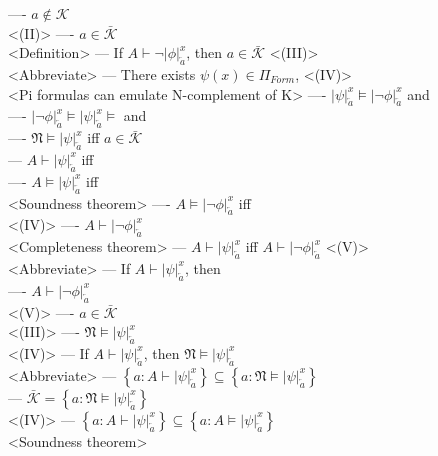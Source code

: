 \documentclass{book}
\newcommand{\inot}{\not}
\newcommand{\set}[1]{\left\{ #1 \right\}}
\newcommand{\sub}[3]{\left|#1\right|_{#3}^{#2}}
\begin{document}
				---- $a \inot \in \mathcal{K}$ \\ <(II)>
				---- $a \in \bar{\mathcal{K}}$ \\ <Definition>
			--- If $A \vdash \lnot \sub{\phi}{x}{\overleftarrow{a}}$, then $a \in \bar{\mathcal{K}}$ <(III)> \\ <Abbreviate>
			--- There exists $\psi(x) \in \Pi_{Form}$, <(IV)> \\ <Pi formulas can emulate N-complement of K>
				---- $\sub{\psi}{x}{\overleftarrow{a}} \vDash \sub{\lnot \phi}{x}{\overleftarrow{a}}$ and \\
				---- $\sub{\lnot \phi}{x}{\overleftarrow{a}} \vDash \sub{\psi}{x}{\overleftarrow{a}} \vDash$ and \\
				---- $\mathfrak{N} \vDash \sub{\psi}{x}{\overleftarrow{a}}$ iff $a \in \bar{\mathcal{K}}$ \\
			--- $A \vdash \sub{\psi}{x}{\overleftarrow{a}}$ iff \\
				---- $A \vDash \sub{\psi}{x}{\overleftarrow{a}}$ iff \\ <Soundness theorem>
				---- $A \vDash \sub{\lnot \phi}{x}{\overleftarrow{a}}$ iff \\ <(IV)>
				---- $A \vdash \sub{\lnot \phi}{x}{\overleftarrow{a}}$ \\ <Completeness theorem>
			--- $A \vdash \sub{\psi}{x}{\overleftarrow{a}}$ iff $A \vdash \sub{\lnot \phi}{x}{\overleftarrow{a}}$ <(V)> \\ <Abbreviate>
			--- If $A \vdash \sub{\psi}{x}{\overleftarrow{a}}$, then \\
				---- $A \vdash \sub{\lnot \phi}{x}{\overleftarrow{a}}$ \\ <(V)>
				---- $a \in \bar{\mathcal{K}}$ \\ <(III)>
				---- $\mathfrak{N} \vDash \sub{\psi}{x}{\overleftarrow{a}}$ \\ <(IV)>
			--- If $A \vdash \sub{\psi}{x}{\overleftarrow{a}}$, then $\mathfrak{N} \vDash \sub{\psi}{x}{\overleftarrow{a}}$ \\ <Abbreviate>
			--- $\set{a: A \vdash \sub{\psi}{x}{\overleftarrow{a}}} \subseteq \set{a: \mathfrak{N} \vDash \sub{\psi}{x}{\overleftarrow{a}}}$ \\
			--- $\bar{\mathcal{K}} = \set{a: \mathfrak{N} \vDash \sub{\psi}{x}{\overleftarrow{a}}}$ \\ <(IV)>
			--- $\set{a: A \vdash \sub{\psi}{x}{\overleftarrow{a}}} \subseteq \set{a: A \vDash \sub{\psi}{x}{\overleftarrow{a}}}$ \\ <Soundness theorem>
\end{document}
